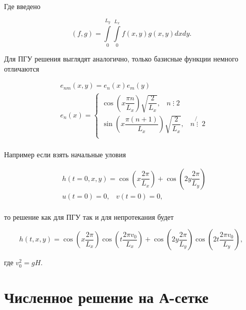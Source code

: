 \documentclass[a4paper,12pt]{article} %
\begin{document}
Где введено 

\begin{equation}
(f,g) = \int\limits_0^{L_y} \int\limits_0^{L_x} f(x,y) g(x,y) dx dy.
\end{equation}

Для ПГУ решения выглядят аналогично, только базисные функции немного отличаются

\begin{equation}
\begin{aligned}
& e_{nm}(x,y) = e_n(x) e_m(y)  \\
& e_n(x) = 
\begin{cases}
\cos{\left( x \dfrac{\pi n}{L_x} \right)} \sqrt{\dfrac{2}{L_x}}, \hspace{10pt} n \mathrel{\vdots} 2 \\ 
\sin{\left( x \dfrac{\pi (n+1)}{L_x} \right)} \sqrt{\dfrac{2}{L_x}}, \hspace{10pt} n \not{\mathrel{\vdots}} \hspace{3pt} 2 \\
\end{cases} \\
\end{aligned}
\end{equation}

Например если взять начальные уловия 

\begin{equation}
\begin{aligned}
& h(t = 0, x, y) = \cos{\left( x \dfrac{2 \pi}{L_x} \right)} + \cos{\left( 2 y \dfrac{2 \pi}{L_y} \right)} \\
& u(t = 0) = 0, \hspace{10pt} v(t = 0) = 0, \\
\end{aligned}
\end{equation}

то решение как для ПГУ так и для непротекания будет

\begin{equation}
h(t, x, y) = \cos{\left( x \dfrac{2 \pi}{L_x} \right)} \cos{\left( t \dfrac{2 \pi v_0}{L_x} \right)} + \cos{\left( 2 y \dfrac{2 \pi}{L_y} \right)} \cos{\left( 2 t \dfrac{2 \pi v_0}{L_y} \right)},
\end{equation}

где $v_0^2 = g H$.

\newpage

\section{Численное решение на А-сетке}
\end{document}
